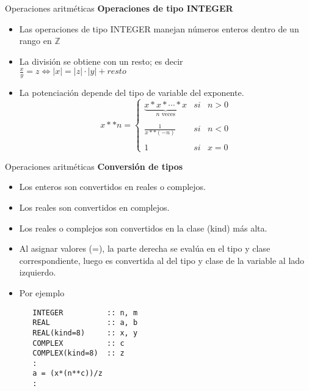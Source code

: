 \begin{frame}[fragile]{Operaciones aritméticas}
\textbf{Operaciones de tipo INTEGER}
 \begin{itemize}[<+(0)->]
  \item Las operaciones de tipo INTEGER manejan números enteros dentro de un rango en $\mathbb{Z}$
  \item La división se obtiene con un resto; es decir\\
  \centering $\frac{x}{y} = z \Longleftrightarrow  |x| = |z| \cdot |y| + resto $
  \item La potenciación depende del tipo de variable del exponente. 
  $$
  x**n = \left\{ \begin{array}{lcc}
             \underbrace{x \ast x \ast \cdots \ast x}_\text{$n$ veces} &   si  & n > 0 \\
             \\ \frac{1}{x \ast \ast (-n)} &  si & n < 0 \\
             \\ 1 &  si  & x = 0 
             \end{array}
   \right.
  $$
 \end{itemize}
\end{frame}

\begin{frame}[fragile]{Operaciones aritméticas}
\textbf{Conversión de tipos}
 \begin{itemize}[<+(0)->]
  \item Los enteros son convertidos en reales o complejos.
  \item Los reales son convertidos en complejos.
  \item Los reales o complejos son convertidos en la clase (kind) más alta.
  \item Al asignar valores (=), la parte derecha se evalúa en el tipo y clase correspondiente, luego es convertida al del tipo y clase de la variable al lado izquierdo.
  \item[] Por ejemplo
  \begin{verbatim}
   INTEGER          :: n, m 
   REAL             :: a, b
   REAL(kind=8)     :: x, y
   COMPLEX          :: c
   COMPLEX(kind=8)  :: z
   :
   a = (x*(n**c))/z
   :
   \end{verbatim}

 \end{itemize}
\end{frame}